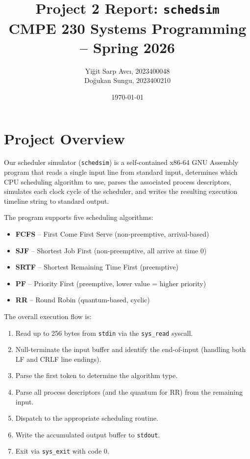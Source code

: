 \documentclass[a4paper,12pt]{article}
\title{Project 2 Report: \texttt{schedsim}\\
\large CMPE 230 Systems Programming -- Spring 2026}
\author{
Yi\u{g}it Sarp Avc\i{}, 2023400048 \\
Do\u{g}ukan Sungu, 2023400210
}
\date{\today}
\begin{document}
\maketitle

\section{Project Overview}

Our scheduler simulator (\texttt{schedsim}) is a self-contained x86-64 GNU Assembly program that reads a single input line from standard input, determines which CPU scheduling algorithm to use, parses the associated process descriptors, simulates each clock cycle of the scheduler, and writes the resulting execution timeline string to standard output.

The program supports five scheduling algorithms:
\begin{itemize}
    \item \textbf{FCFS} -- First Come First Serve (non-preemptive, arrival-based)
    \item \textbf{SJF} -- Shortest Job First (non-preemptive, all arrive at time 0)
    \item \textbf{SRTF} -- Shortest Remaining Time First (preemptive)
    \item \textbf{PF} -- Priority First (preemptive, lower value = higher priority)
    \item \textbf{RR} -- Round Robin (quantum-based, cyclic)
\end{itemize}

The overall execution flow is:
\begin{enumerate}
    \item Read up to 256 bytes from \texttt{stdin} via the \texttt{sys\_read} syscall.
    \item Null-terminate the input buffer and identify the end-of-input (handling both LF and CRLF line endings).
    \item Parse the first token to determine the algorithm type.
    \item Parse all process descriptors (and the quantum for RR) from the remaining input.
    \item Dispatch to the appropriate scheduling routine.
    \item Write the accumulated output buffer to \texttt{stdout}.
    \item Exit via \texttt{sys\_exit} with code 0.
\end{enumerate}
\end{document}
